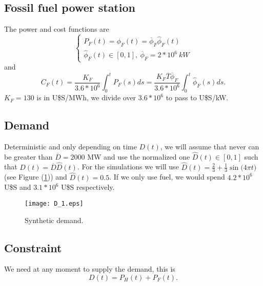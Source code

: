 \documentclass[12pt]{article}
\theoremstyle{definition}
\theoremstyle{remark}
\begin{document}
\subsection{Fossil fuel power station}

The power and cost functions are
\begin{equation*}
\begin{cases}
P_F(t)=\phi_F(t)=\overline{\phi}_F\hat{\phi}_F(t)\\
\hat{\phi}_F(t)\in[0,1],\ \overline{\phi}_F=2*10^6\ kW
\end{cases}
\end{equation*}
and
\begin{equation*}
C_F(t)=\frac{K_F}{3.6*10^6}\int_0^tP_F(s)ds=\frac{K_F\overline{T}\overline{\phi}_F}{3.6*10^6}\int_0^t\hat{\phi}_F(s)ds.
\end{equation*}
$K_F=130$ is in U\$S/MWh, we divide over $3.6*10^6$ to pass to U\$S/kW.

\subsection{Demand}

Deterministic and only depending on time $D(t)$, we will assume that never can be greater than $\overline{D}=2000$ MW and use the normalized one $\hat{D}(t)\in[0,1]$ such that $D(t)=\overline{D}\hat{D}(t)$. For the simulations we will use $\hat{D}(t)=\frac{2}{3}+\frac{1}{3}\sin\big(4\pi t\big)$ (see Figure (\ref{D_1})) and $\hat{D}(t)=0.5$. If we only use fuel, we would spend $4.2*10^6$ U\$S and  $3.1*10^6$ U\$S respectively.
\begin{figure}[ht!]
\centering
\texttt{[image: D\_1.eps]}
\caption{Synthetic demand.}
\label{D_1}
\end{figure}

\subsection{Constraint}

We need at any moment to supply the demand, this is
\begin{equation*}
D(t)=P_H(t)+P_F(t).
\end{equation*}
\end{document}
